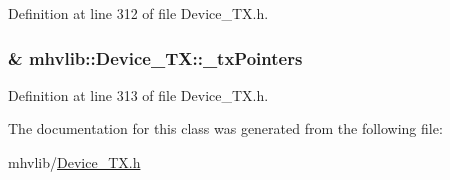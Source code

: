 Definition at line 312 of file Device\-\_\-\-T\-X.\-h.

\hypertarget{classmhvlib_1_1_device___t_x_ad1a3f6fa7db2593694280e8dca963b33}{
\subsubsection[{\-\_\-tx\-Pointers}]{\& mhvlib\-::\-Device\-\_\-\-T\-X\-::\-\_\-tx\-Pointers\hspace{0.3cm}{\ttfamily [protected]}}}\label{classmhvlib_1_1_device___t_x_ad1a3f6fa7db2593694280e8dca963b33}


Definition at line 313 of file Device\-\_\-\-T\-X.\-h.



The documentation for this class was generated from the following file\-:\begin{DoxyCompactItemize}
\item 
mhvlib/\hyperlink{_device___t_x_8h}{Device\-\_\-\-T\-X.\-h}\end{DoxyCompactItemize}
